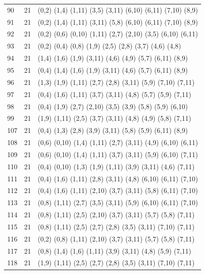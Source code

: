 \begin{appendix}
{\begin{longtable}{lll}
90 & 21 & (0,2)   (1,4)  (1,11) (3,5)   (3,11)  (6,10)  (6,11)  (7,10)  (8,9)\\
91 & 21 & (0,2)   (1,4)  (1,11) (3,11)  (5,8)   (6,10)  (6,11)  (7,10)  (8,9)\\
92 & 21 & (0,2)   (0,6)  (0,10) (1,11)  (2,7)   (2,10)  (3,5)   (6,10)  (6,11)\\
93 & 21 & (0,2)   (0,4)  (0,8)  (1,9)   (2,5)   (2,8)   (3,7)   (4,6)   (4,8)\\
94 & 21 & (1,4)   (1,6)  (1,9)  (3,11)  (4,6)   (4,9)   (5,7)   (6,11)  (8,9)\\
95 & 21 & (0,4)   (1,4)  (1,6)  (1,9)   (3,11)  (4,6)   (5,7)   (6,11)  (8,9)\\
96 & 21 & (1,3)   (1,9)  (1,11) (2,7)   (2,8)   (3,11)  (5,9)   (7,10)  (7,11)\\
97 & 21 & (0,4)   (1,6)  (1,11) (3,7)   (3,11)  (4,8)   (5,7)   (5,9)   (7,11)\\
98 & 21 & (0,4)   (1,9)  (2,7)  (2,10)  (3,5)   (3,9)   (5,8)   (5,9)   (6,10)\\
99 & 21 & (1,9)   (1,11) (2,5)  (3,7)   (3,11)  (4,8)   (4,9)   (5,8)   (7,11)\\
107& 21 & (0,4)   (1,3)  (2,8)  (3,9)   (3,11)  (5,8)   (5,9)   (6,11)  (8,9)\\
108& 21 & (0,6)   (0,10) (1,4)  (1,11)  (2,7)   (3,11)  (4,9)   (6,10)  (6,11)\\
109& 21 & (0,6)   (0,10) (1,4)  (1,11)  (3,7)   (3,11)  (5,9)   (6,10)  (7,11)\\
110& 21 & (0,4)   (0,10) (1,3)  (1,9)   (1,11)  (3,9)   (3,11)  (4,6)   (7,11)\\
111& 21 & (0,4)   (1,6)  (1,11) (2,8)   (3,11)  (4,8)   (6,10)  (6,11)  (7,10)\\
112& 21 & (0,4)   (1,6)  (1,11) (2,10)  (3,7)   (3,11)  (5,8)   (6,11)  (7,10)\\
113& 21 & (0,8)   (1,11) (2,7)  (3,5)   (3,11)  (5,9)   (6,10)  (6,11)  (7,10)\\
114& 21 & (0,8)   (1,11) (2,5)  (2,10)  (3,7)   (3,11)  (5,7)   (5,8)   (7,11)\\
115& 21 & (0,8)   (1,11) (2,5)  (2,7)   (2,8)   (3,5)   (3,11)  (7,10)  (7,11)\\
116& 21 & (0,2)   (0,8)  (1,11) (2,10)  (3,7)   (3,11)  (5,7)   (5,8)   (7,11)\\
117& 21 & (0,8)   (1,4)  (1,6)  (1,11)  (3,9)   (3,11)  (4,8)   (5,9)   (7,11)\\
118& 21 & (1,9)   (1,11) (2,5)  (2,7)   (2,8)   (3,5)   (3,11)  (7,10)  (7,11)\\

\end{longtable}}
\end{appendix}

